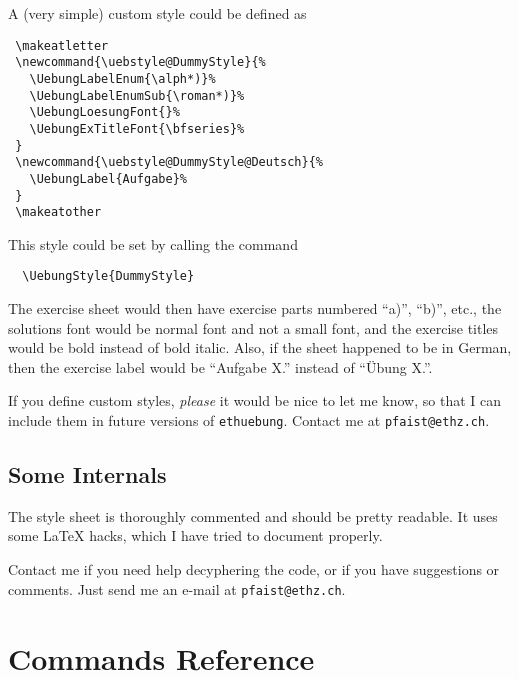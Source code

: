 \documentclass[11pt,a4paper]{article}
\begin{document}
A (very simple) custom style could be defined as
\begin{pkgverbatim}
\begin{verbatim}
 \makeatletter
 \newcommand{\uebstyle@DummyStyle}{%
   \UebungLabelEnum{\alph*)}%
   \UebungLabelEnumSub{\roman*)}%
   \UebungLoesungFont{}%
   \UebungExTitleFont{\bfseries}%
 }
 \newcommand{\uebstyle@DummyStyle@Deutsch}{%
   \UebungLabel{Aufgabe}%
 }
 \makeatother
\end{verbatim}
\end{pkgverbatim}

This style could be set by calling the command
\begin{pkgverbatim}
\begin{verbatim}
  \UebungStyle{DummyStyle}
\end{verbatim}
\end{pkgverbatim}

The exercise sheet would then have exercise parts numbered ``a)'', ``b)'', etc., the
solutions font would be normal font and not a small font, and the exercise titles would be
bold instead of bold italic. Also, if the sheet happened to be in German, then the
exercise label would be ``Aufgabe X.'' instead of ``\"Ubung X.''.

\begin{pkgnotice}
  If you define custom styles, \emph{please} it would be nice to let me know, so that I
  can include them in future versions of \texttt{ethuebung}. Contact me at
  \texttt{pfaist@ethz.ch}.
\end{pkgnotice}






\subsection{Some Internals}
\label{sec:Internals}

The style sheet is thoroughly commented and should be pretty readable. It uses some
\LaTeX{} hacks, which I have tried to document properly.

Contact me if you need help decyphering the code, or if you have suggestions or
comments. Just send me an e-mail at \texttt{pfaist@ethz.ch}.



\section{Commands Reference}
\label{sec:AllCommands}
\end{document}
